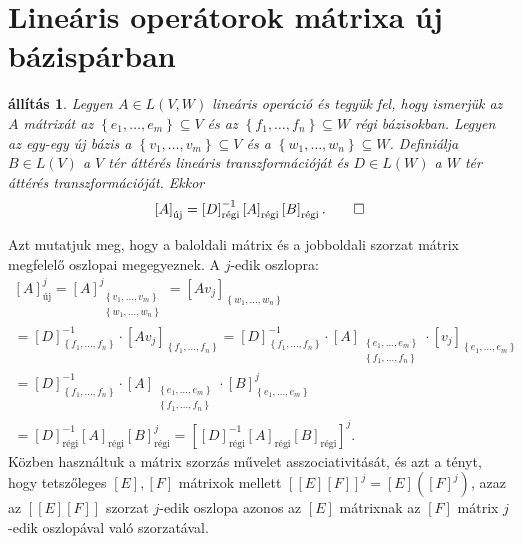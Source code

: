 \documentclass[a4paper, showtrims]{memoir}
\makeatletter
\renewenvironment{proof}[1][\proofname]
    {\par\pushQED{\qed}%
    \normalfont \topsep6\p@\@plus6\p@\relax
    \trivlist
    \item[\hskip\labelsep
        \itshape
    #1\@addpunct{:}]\ignorespaces}
    {\popQED\endtrivlist\@endpefalse}
\theoremstyle{plain}
\newtheorem{proposition}{állítás}[chapter]
\theoremstyle{remark}
\theoremstyle{definition}
\newcommand{\uj}{\text{új}}
\newcommand{\rgi}{\text{régi}}
\makeatother
\begin{document}
\section{Lineáris operátorok mátrixa új bázispárban}
\begin{proposition}
	Legyen $A\in L\left( V,W \right)$ lineáris operáció
	és tegyük fel, hogy ismerjük az $A$ mátrixát az
	$\left\{ e_1,\ldots,e_m \right\}\subseteq V$ és az
	$\left\{ f_1,\ldots,f_n \right\}\subseteq W$ régi bázisokban.
	Legyen az egy-egy új bázis a $\left\{ v_1,\ldots,v_m \right\}\subseteq V$
	és a $\left\{ w_1,\ldots,w_n \right\}\subseteq W$.
	Definiálja $B\in L\left( V \right)$ a $V$ tér áttérés lineáris transzformációját
	és $D\in L\left( W \right)$ a $W$ tér áttérés transzformációját.
	Ekkor
	\[
		\left[ A \right]_{\uj}=
		\left[ D \right]_{\rgi}^{-1}\left[ A \right]_{\rgi}\left[ B \right]_{\rgi}.\qedhere
	\]
\end{proposition}
\begin{proof}
	Azt mutatjuk meg, hogy a baloldali mátrix és a jobboldali szorzat mátrix megfelelő oszlopai megegyeznek.
	A $j$-edik oszlopra:
	\begin{multline*}
		\left[ A \right]_{\uj}^j
		=
		\left[ A \right]_{\substack{\left\{ v_1,\ldots,v_m \right\}\\ \left\{ w_1,\ldots,w_n \right\}}}^j
		=
		\left[ Av_j \right]_{\left\{ w_1,\ldots,w_n \right\}}
		\\
		=
		\left[ D \right]^{-1}_{\left\{ f_1,\ldots,f_n \right\}}\cdot
		\left[ Av_j \right]_{\left\{ f_1,\ldots,f_n \right\}}
		=
		\left[ D \right]^{-1}_{\left\{ f_1,\ldots,f_n \right\}}\cdot
		\left[ A \right]_{\substack{\left\{ e_1,\ldots,e_m \right\}\\ \left\{ f_1,\ldots,f_n \right\}}}
		\cdot
		\left[ v_j \right]_{\left\{ e_1,\ldots,e_m \right\}}
		\\
		=
		\left[ D \right]^{-1}_{\left\{ f_1,\ldots,f_n \right\}}\cdot
		\left[ A \right]_{\substack{\left\{ e_1,\ldots,e_m \right\}\\ \left\{ f_1,\ldots,f_n \right\}}}
		\cdot
		\left[ B \right]_{\left\{ e_1,\ldots,e_m \right\}}^j
		\\
		=
		\left[ D \right]_\rgi^{-1}
		\left[ A \right]_\rgi
		\left[ B \right]_\rgi^j
		=
        \left[ \left[ D \right]^{-1}_\rgi\left[ A \right]_\rgi\left[ B \right]_\rgi \right]^j.
	\end{multline*}
	Közben használtuk a mátrix szorzás művelet asszociativitását,
	és azt a tényt,
	hogy tetszőleges $\left[ E \right],\left[ F \right]$ mátrixok mellett
    $\left[ \left[ E \right]\left[ F \right] \right]^j=\left[ E \right]\left( \left[F  \right]^j \right)$, azaz
    az $\left[ \left[ E \right]\left[ F \right] \right]$ szorzat $j$-edik oszlopa azonos az $\left[ E \right]$ mátrixnak az $\left[ F \right]$ mátrix $j$-edik oszlopával való szorzatával.
\end{proof}
\end{document}
